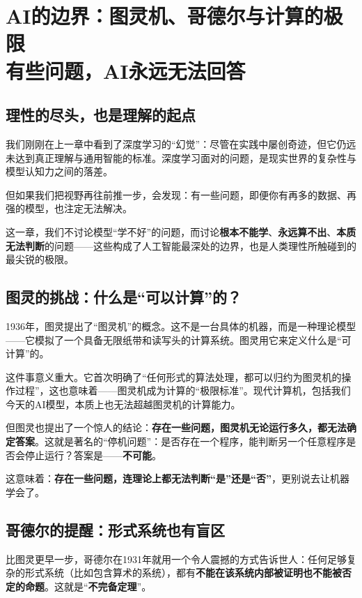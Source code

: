  \chapter{AI的边界：图灵机、哥德尔与计算的极限\\\large{}有些问题，AI永远无法回答}
 
\section*{理性的尽头，也是理解的起点}

我们刚刚在上一章中看到了深度学习的“幻觉”：尽管在实践中屡创奇迹，但它仍远未达到真正理解与通用智能的标准。深度学习面对的问题，是现实世界的复杂性与模型认知力之间的落差。

但如果我们把视野再往前推一步，会发现：有一些问题，即便你有再多的数据、再强的模型，也注定无法解决。

这一章，我们不讨论模型“学不好”的问题，而讨论\textbf{根本不能学}、\textbf{永远算不出}、\textbf{本质无法判断}的问题——这些构成了人工智能最深处的边界，也是人类理性所触碰到的最尖锐的极限。

\section*{图灵的挑战：什么是“可以计算”的？}

1936年，图灵提出了“图灵机”的概念。这不是一台具体的机器，而是一种理论模型——它模拟了一个具备无限纸带和读写头的计算系统。图灵用它来定义什么是“可计算”的。

这件事意义重大。它首次明确了“任何形式的算法处理，都可以归约为图灵机的操作过程”，这也意味着——图灵机成为计算的“极限标准”。现代计算机，包括我们今天的AI模型，本质上也无法超越图灵机的计算能力。

但图灵也提出了一个惊人的结论：\textbf{存在一些问题，图灵机无论运行多久，都无法确定答案}。这就是著名的“停机问题”：是否存在一个程序，能判断另一个任意程序是否会停止运行？答案是——\textbf{不可能}。

这意味着：\textbf{存在一些问题，连理论上都无法判断“是”还是“否”}，更别说去让机器学会了。

\section*{哥德尔的提醒：形式系统也有盲区}

比图灵更早一步，哥德尔在1931年就用一个令人震撼的方式告诉世人：任何足够复杂的形式系统（比如包含算术的系统），都有\textbf{不能在该系统内部被证明也不能被否定的命题}。这就是“\textbf{不完备定理}”。

